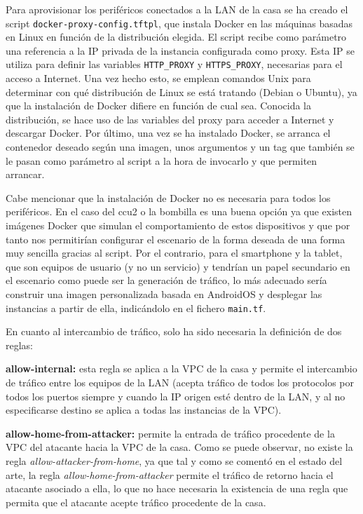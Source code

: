   Para aprovisionar los periféricos conectados a la LAN de la casa se ha creado el script \texttt{docker-proxy-config.tftpl}, que instala Docker en las máquinas basadas en Linux en función de la distribución elegida. El script recibe como parámetro una referencia a la IP privada de la instancia configurada como proxy. Esta IP se utiliza para definir las variables \texttt{HTTP\_PROXY} y \texttt{HTTPS\_PROXY}, necesarias para el acceso a Internet. Una vez hecho esto, se emplean comandos Unix para determinar con qué distribución de Linux se está tratando (Debian o Ubuntu), ya que la instalación de Docker difiere en función de cual sea. Conocida la distribución, se hace uso de las variables del proxy para acceder a Internet y descargar Docker. Por último, una vez se ha instalado Docker, se arranca el contenedor deseado según una imagen, unos argumentos y un tag que también se le pasan como parámetro al script a la hora de invocarlo y que permiten arrancar.

  Cabe mencionar que la instalación de Docker no es necesaria para todos los periféricos. En el caso del ccu2 o la bombilla es una buena opción ya que existen imágenes Docker que simulan el comportamiento de estos dispositivos y que por tanto nos permitirían configurar el escenario de la forma deseada de una forma muy sencilla gracias al script. Por el contrario, para el smartphone y la tablet, que son equipos de usuario (y no un servicio) y tendrían un papel secundario en el escenario como puede ser la generación de tráfico, lo más adecuado sería construir una imagen personalizada basada en AndroidOS y desplegar las instancias a partir de ella, indicándolo en el fichero \texttt{main.tf}.

  En cuanto al intercambio de tráfico, solo ha sido necesaria la definición de dos reglas:

  \textbf{allow-internal:} esta regla se aplica a la VPC de la casa y permite el intercambio de tráfico entre los equipos de la LAN (acepta tráfico de todos los protocolos por todos los puertos siempre y cuando la IP origen esté dentro de la LAN, y al no especificarse destino se aplica a todas las instancias de la VPC). 

  \textbf{allow-home-from-attacker:} permite la entrada de tráfico procedente de la VPC del atacante hacia la VPC de la casa. Como se puede observar, no existe la regla \textit{allow-attacker-from-home}, ya que tal y como se comentó en el estado del arte, la regla \textit{allow-home-from-attacker} permite el tráfico de retorno hacia el atacante asociado a ella, lo que no hace necesaria la existencia de una regla que permita que el atacante acepte tráfico procedente de la casa.


